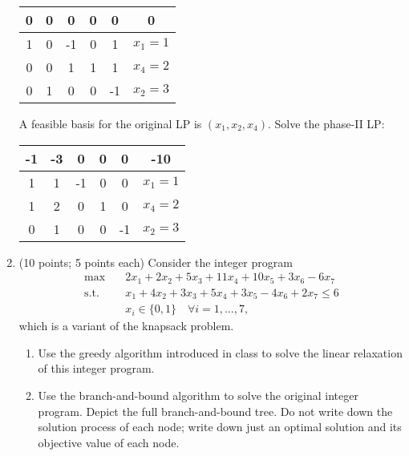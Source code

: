\documentclass[12pt]{article}
\begin{document}
\begin{enumerate}
\begin{table}[H]
\begin{tabular}{ccccc|c}
                        0 & 0 & 0  & 0 & 0  & 0       \\
                        \hline
                        1 & 0 & -1 & 0 & 1  & $x_1=1$ \\
                        0 & 0 & 1  & 1 & 1  & $x_4=2$ \\
                        0 & 1 & 0  & 0 & -1 & $x_2=3$ \\
                  \end{tabular}
            \end{table}
            A feasible basis for the original LP is $(x_1,x_2,x_4)$.
            Solve the phase-II LP:
            \begin{table}[H]
                  \centering
                  \begin{tabular}{ccccc|c}
                        -1 & -3 & 0  & 0 & 0  & -10     \\
                        \hline
                        1  & 1  & -1 & 0 & 0  & $x_1=1$ \\
                        1  & 2  & 0  & 1 & 0  & $x_4=2$ \\
                        0  & 1  & 0  & 0 & -1 & $x_2=3$ \\
                  \end{tabular}
            \end{table}
      \item (10 points; 5 points each) Consider the integer program
            \begin{align*}
                  \max \quad       & 2x_1 + 2x_2 + 5x_3 + 11x_4 + 10x_5+3x_6 -6x_7       \\
                  \text{s.t.}\quad & x_1 + 4x_2 + 3x_3 + 5x_4 + 3x_5 -4x_6 + 2x_7 \leq 6 \\
                                   & x_i \in \{0,1\} \quad \forall i = 1,...,7,
            \end{align*}
            which is a variant of the knapsack problem.
            \begin{enumerate}
                  \item Use the greedy algorithm introduced in class to solve the linear relaxation of this integer program.
                  \item Use the branch-and-bound algorithm to solve the original integer program. Depict the full branch-and-bound tree. Do not write down the solution process of each node; write down just an optimal solution and its objective value of each node.
            \end{enumerate}

\end{enumerate}
\end{document}
